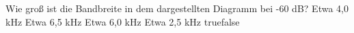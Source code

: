     {Wie groß ist die Bandbreite in dem dargestellten Diagramm bei -60 dB?}
    {Etwa 4,0 kHz}
    {Etwa 6,5 kHz}
    {Etwa 6,0 kHz}
    {Etwa 2,5 kHz}
    {true}{false}
